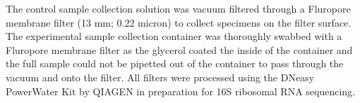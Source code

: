 The control sample collection solution was vacuum filtered through a Fluropore membrane filter (13 mm; 0.22 micron) to collect specimens on the filter surface. The experimental sample collection container was thoroughly swabbed with a Fluropore membrane filter as the glycerol coated the inside of the container and the full sample could not be pipetted out of the container to pass through the vacuum and onto the filter. All filters were processed using the DNeasy PowerWater Kit by QIAGEN \cite{PowerWaterKit} in preparation for 16S ribosomal RNA sequencing.   









